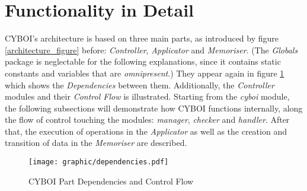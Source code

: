 %
%
%
%
%
%
%

\section{Functionality in Detail}
\label{functionality_in_detail_heading}

CYBOI's architecture is based on three main parts, as introduced by figure
\ref{architecture_figure} before: \emph{Controller}, \emph{Applicator} and
\emph{Memoriser}. (The \emph{Globals} package is neglectable for the following
explanations, since it contains static constants and variables that are
\emph{omnipresent}.) They appear again in figure \ref{dependencies_figure}
which shows the \emph{Dependencies} between them. Additionally, the
\emph{Controller} modules and their \emph{Control Flow} is illustrated.
Starting from the \emph{cyboi} module, the following subsections will
demonstrate how CYBOI functions internally, along the flow of control touching
the modules: \emph{manager}, \emph{checker} and \emph{handler}. After that, the
execution of operations in the \emph{Applicator} as well as the creation and
transition of data in the \emph{Memoriser} are described.

\begin{figure}[ht]
    \begin{center}
        \texttt{[image: graphic/dependencies.pdf]}
        \caption{CYBOI Part Dependencies and Control Flow}
        \label{dependencies_figure}
    \end{center}
\end{figure}








%
